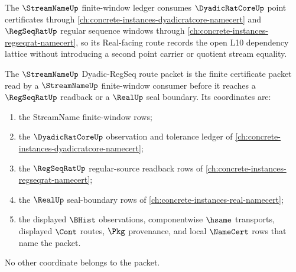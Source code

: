 The $\StreamNameUp$ finite-window ledger consumes $\DyadicRatCoreUp$ point certificates through \autoref{ch:concrete-instances-dyadicratcore-namecert} and $\RegSeqRatUp$ regular sequence windows through \autoref{ch:concrete-instances-regseqrat-namecert}, so its Real-facing route records the open L10 dependency lattice without introducing a second point carrier or quotient stream equality.

\begin{definition}
\label{def:streamname-dyadic-regseq-route-packet}
The $\StreamNameUp$ Dyadic-RegSeq route packet is the finite certificate
packet read by a $\StreamNameUp$ finite-window consumer before it reaches a
$\RegSeqRatUp$ readback or a $\RealUp$ seal boundary. Its coordinates are:
\begin{enumerate}
\item the StreamName finite-window rows;
\item the $\DyadicRatCoreUp$ observation and tolerance ledger of
  \autoref{ch:concrete-instances-dyadicratcore-namecert};
\item the $\RegSeqRatUp$ regular-source readback rows of
  \autoref{ch:concrete-instances-regseqrat-namecert};
\item the $\RealUp$ seal-boundary rows of
  \autoref{ch:concrete-instances-real-namecert};
\item the displayed $\BHist$ observations, componentwise $\hsame$
  transports, displayed $\Cont$ routes, $\Pkg$ provenance, and local
  $\NameCert$ rows that name the packet.
\end{enumerate}
No other coordinate belongs to the packet.
\end{definition}

